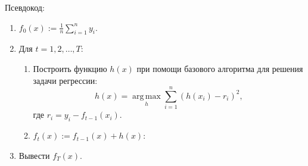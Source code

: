 \documentclass[a4paper, 12pt, onepage]{article}
\begin{document}
\bigskip
\begin{framed}
Псевдокод:
\begin{enumerate}
  \item $f_0(x) := \frac1n \sum_{i=1}^n y_i$.
  \item Для $t = 1, 2, \ldots, T$:
    \begin{enumerate}
      \item Построить функцию $h(x)$ при помощи базового алгоритма для решения задачи регрессии:
        $$ h(x) = \underset{h}{\operatorname{arg\,max}} \sum_{i=1}^n (h(x_i) - r_i)^2,$$
	где $r_i = y_i - f_{t-1}(x_i)$.
      \item $f_t(x) := f_{t-1}(x) + h(x)$:
    \end{enumerate}
  \item Вывести $f_T(x)$.
\end{enumerate}
\end{framed}
\end{document}
